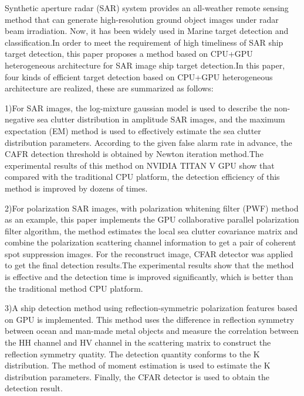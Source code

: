 \begin{eabstract}
  Synthetic aperture radar (SAR) system provides an all-weather remote sensing method 
  that can generate high-resolution ground object images under radar beam irradiation. 
  Now, it has been widely used in Marine target detection and classification.In order 
  to meet the requirement of high timeliness of SAR ship target detection, this paper
  proposes a method based on CPU+GPU heterogeneous architecture for SAR image ship target 
  detection.In this paper, four kinds of efficient target detection based on CPU+GPU heterogeneous
  architecture are realized, these are summarized as follows:

  1)For SAR images, the log-mixture gaussian model is used to describe the non-negative 
  sea clutter distribution in amplitude SAR images, and the maximum expectation (EM) 
  method is used to effectively estimate the sea clutter distribution parameters. 
  According to the given false alarm rate in advance, the CAFR detection threshold is 
  obtained by Newton iteration method.The experimental results of this method on NVIDIA
  TITAN V GPU show that compared with the traditional CPU platform, the detection
  efficiency of this method is improved by dozens of times.

  2)For polarization SAR images, with polarization whitening filter (PWF) method as an example,
  this paper implements the GPU collaborative parallel polarization filter algorithm, the method 
  estimates the local sea clutter covariance matrix and combine the polarization scattering channel information to 
  get a pair of coherent spot suppression images. For the reconstruct image, CFAR detector was applied to get the 
  final detection results.The experimental results show that the method is effective and the detection 
  time is improved significantly, which is better than the traditional method
  CPU platform.

  3)A ship detection method using reflection-symmetric polarization features based on GPU 
  is implemented. This method uses the difference in reflection symmetry between ocean and 
  man-made metal objects and measure the correlation between the HH channel and HV channel in the scattering matrix 
  to construct the reflection symmetry quatity.  The detection quantity conforms to the K distribution. 
  The method of moment estimation is used to estimate the K distribution parameters.
   Finally, the CFAR detector is used to obtain the detection result.


\end{eabstract}
